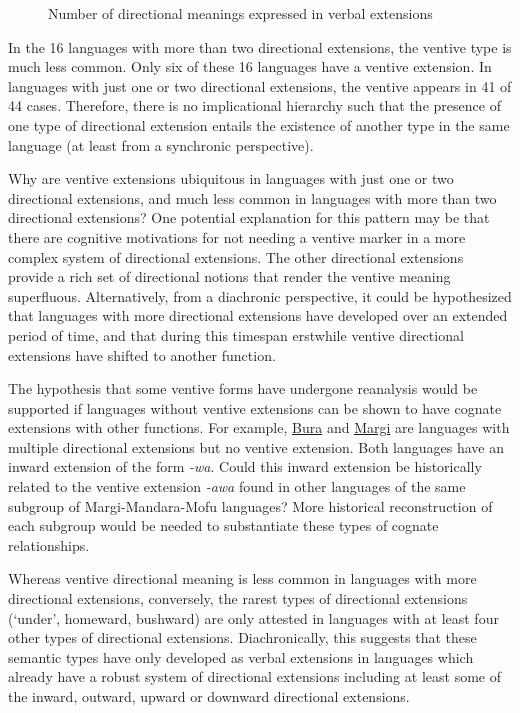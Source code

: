 \begin{figure}
	\caption{Number of directional meanings expressed in verbal extensions}
	\label{fig:multiple}
\end{figure}

In the 16 languages with more than two directional extensions, the ventive type is much less common. Only six of these 16 languages have a ventive extension. In languages with just one or two directional extensions, the ventive appears in 41 of 44 cases. Therefore, there is no implicational hierarchy such that the presence of one type of directional extension entails the existence of another type in the same language (at least from a synchronic perspective). 

Why are ventive extensions ubiquitous in languages with just one or two directional extensions, and much less common in languages with more than two directional extensions? One potential explanation for this pattern may be that there are cognitive motivations for not needing a ventive marker in a more complex system of directional extensions. The other directional extensions provide a rich set of directional notions that render the ventive meaning superfluous. Alternatively, from a diachronic perspective, it could be hypothesized that languages with more directional extensions have developed over an extended period of time, and that during this timespan erstwhile ventive directional extensions have shifted to another function. 

The hypothesis that some ventive forms have undergone reanalysis would be supported if languages without ventive extensions can be shown to have cognate extensions with other functions. For example, \hyperref[bura]{Bura} and \hyperref[marg]{Margi} are languages with multiple directional extensions but no ventive extension. Both languages have an inward extension of the form \textit{-wa}. Could this inward extension be historically related to the ventive extension \textit{-awa} found in other languages of the same subgroup of Margi-Mandara-Mofu languages? More historical reconstruction of each subgroup would be needed to substantiate these types of cognate relationships.

Whereas ventive directional meaning is less common in languages with more directional extensions, conversely, the rarest types of directional extensions (`under', homeward, bushward) are only attested in languages with at least four other types of directional extensions. Diachronically, this suggests that these semantic types have only developed as verbal extensions in languages which already have a robust system of directional extensions including at least some of the inward, outward, upward or downward directional extensions. 

